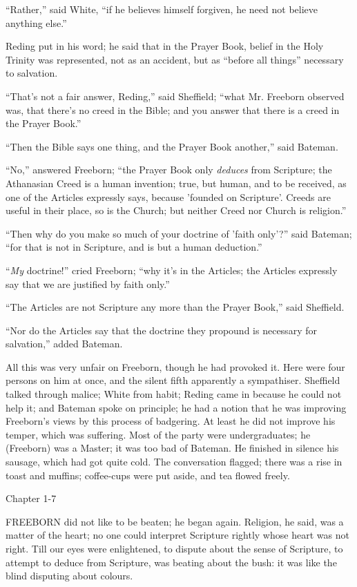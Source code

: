 ``Rather,'' said White, ``if he believes himself
forgiven, he need not believe anything else.''

Reding put in his word; he said that in the Prayer Book, belief in
the Holy Trinity was represented, not as an accident, but as
``before all things'' necessary to salvation.

``That's not a fair answer, Reding,'' said Sheffield;
``what Mr. Freeborn observed was, that there's no creed in the
Bible; and you answer that there is a creed in the Prayer Book.''

``Then the Bible says one thing, and the Prayer Book
another,'' said Bateman.

``No,'' answered Freeborn; ``the Prayer Book only \emph{deduces}
from Scripture; the Athanasian Creed is a human invention; true, but
human, and to be received, as one of the Articles expressly says,
because 'founded on Scripture'. Creeds are useful in their place, so
is the Church; but neither Creed nor Church is religion.''

``Then why do you make so much of your doctrine of 'faith
only'?'' said Bateman; ``for that is not in Scripture, and is
but a human deduction.''

``\emph{My} doctrine!'' cried Freeborn; ``why it's in
the Articles; the Articles expressly say that we are justified by
faith only.''

``The Articles are not Scripture any more than the Prayer
Book,'' said Sheffield.

``Nor do the Articles say that the doctrine they propound is
necessary for salvation,'' added Bateman.

All this was very unfair on Freeborn, though he had provoked it.
Here were four persons on him at once, and the silent fifth apparently
a sympathiser. Sheffield talked through malice; White from habit;
Reding came in because he could not help it; and Bateman spoke on
principle; he had a notion that he was improving Freeborn's views by
this process of badgering. At least he did not improve his temper,
which was suffering. Most of the party were undergraduates; he
(Freeborn) was a Master; it was too bad of Bateman. He finished in
silence his sausage, which had got quite cold. The conversation
flagged; there was a rise in toast and muffins; coffee-cups were put
aside, and tea flowed freely.

Chapter 1-7


FREEBORN did not like to be beaten; he
began again. Religion, he said, was a matter of the heart; no one
could interpret Scripture rightly whose heart was not right. Till our
eyes were enlightened, to dispute about the sense of Scripture, to
attempt to deduce from Scripture, was beating about the bush: it was
like the blind disputing about colours.

